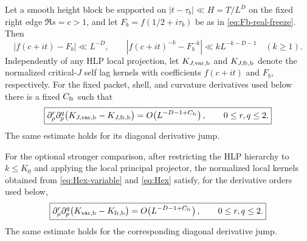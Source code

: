 \begin{lemma}
\label{lem:block-freezing}
Let a smooth height block be supported on
$|t-\tau_b|\ll H=T/L^D$ on the fixed right edge $\Re s=c>1$, and let
$F_b=f(1/2+i\tau_b)$ be as in \eqref{eq:Fb-real-freeze}. Then
\begin{equation}
\boxed{
|f(c+it)-F_b|\ll L^{-D},
\qquad
|f(c+it)^{-k}-F_b^{-k}|
\ll kL^{-k-D-1}\quad(k\ge1).
}
\label{eq:block-freezing-coeff}
\end{equation}
Independently of any HLP local projection, let $K_{J,\rm var,b}$ and
$K_{J,\rm fr,b}$ denote the normalized critical-$J$ self lag kernels with
coefficients $f(c+it)$ and $F_b$, respectively.  For the fixed packet, shell,
and curvature derivatives used below there is a fixed $C_{\rm fr}$ such that
\begin{equation}
\boxed{
\partial_\rho^r\partial_p^q
\bigl(K_{J,\rm var,b}-K_{J,\rm fr,b}\bigr)
=O\!\left(L^{-D-1+C_{\rm fr}}\right),
\qquad 0\le r,q\le2.
}
\label{eq:self-freezing-kernel}
\end{equation}
The same estimate holds for its diagonal derivative jump.

For the optional stronger comparison, after restricting the HLP hierarchy to
$k\le K_0$ and applying the local principal projector, the normalized local
kernels obtained from \eqref{eq:Hex-variable} and \eqref{eq:Hex} satisfy,
for the derivative orders used below,
\begin{equation}
\boxed{
\partial_\rho^r\partial_p^q
\bigl(K_{\rm var,b}-K_{\rm fr,b}\bigr)
=O\!\left(L^{-D-1+C_{\rm fr}}\right),
\qquad 0\le r,q\le2.
}
\label{eq:block-freezing-kernel}
\end{equation}
The same estimate holds for the corresponding diagonal derivative jump.
\end{lemma}

